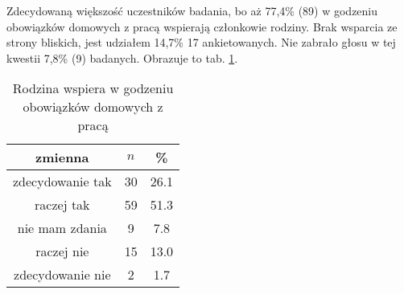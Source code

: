


Zdecydowaną większość uczestników badania, bo aż 77,4\% (89) w godzeniu obowiązków  domowych z pracą wspierają członkowie rodziny. Brak wsparcia ze strony bliskich, jest udziałem 14,7\% {17} ankietowanych. Nie zabrało głosu w tej kwestii 7,8\% (9) badanych. Obrazuje to tab. \ref{tab:Q26}.





\begin{table}[H]
\caption{Rodzina wspiera w godzeniu obowiązków domowych z pracą}
\centering
\begin{tabular}{ | c | c | c |}
\hline
zmienna & $n$ & \% \\
\hline
zdecydowanie tak  &  30  & 26.1 \\
\hline
raczej tak  &  59  & 51.3 \\
\hline
nie mam zdania  &  9  & 7.8 \\
\hline
raczej nie  &  15  & 13.0 \\
\hline
zdecydowanie nie  &  2  & 1.7\\
\hline
\end{tabular}
\label{tab:Q26}
\end{table}
